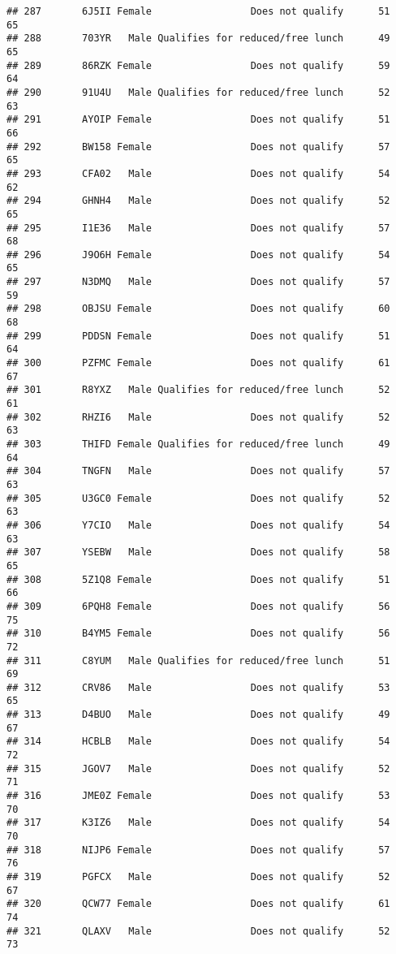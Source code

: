 \documentclass[
]{article}
\begin{document}
\begin{verbatim}
## 287       6J5II Female                 Does not qualify      51       65
## 288       703YR   Male Qualifies for reduced/free lunch      49       65
## 289       86RZK Female                 Does not qualify      59       64
## 290       91U4U   Male Qualifies for reduced/free lunch      52       63
## 291       AYOIP Female                 Does not qualify      51       66
## 292       BW158 Female                 Does not qualify      57       65
## 293       CFA02   Male                 Does not qualify      54       62
## 294       GHNH4   Male                 Does not qualify      52       65
## 295       I1E36   Male                 Does not qualify      57       68
## 296       J9O6H Female                 Does not qualify      54       65
## 297       N3DMQ   Male                 Does not qualify      57       59
## 298       OBJSU Female                 Does not qualify      60       68
## 299       PDDSN Female                 Does not qualify      51       64
## 300       PZFMC Female                 Does not qualify      61       67
## 301       R8YXZ   Male Qualifies for reduced/free lunch      52       61
## 302       RHZI6   Male                 Does not qualify      52       63
## 303       THIFD Female Qualifies for reduced/free lunch      49       64
## 304       TNGFN   Male                 Does not qualify      57       63
## 305       U3GC0 Female                 Does not qualify      52       63
## 306       Y7CIO   Male                 Does not qualify      54       63
## 307       YSEBW   Male                 Does not qualify      58       65
## 308       5Z1Q8 Female                 Does not qualify      51       66
## 309       6PQH8 Female                 Does not qualify      56       75
## 310       B4YM5 Female                 Does not qualify      56       72
## 311       C8YUM   Male Qualifies for reduced/free lunch      51       69
## 312       CRV86   Male                 Does not qualify      53       65
## 313       D4BUO   Male                 Does not qualify      49       67
## 314       HCBLB   Male                 Does not qualify      54       72
## 315       JGOV7   Male                 Does not qualify      52       71
## 316       JME0Z Female                 Does not qualify      53       70
## 317       K3IZ6   Male                 Does not qualify      54       70
## 318       NIJP6 Female                 Does not qualify      57       76
## 319       PGFCX   Male                 Does not qualify      52       67
## 320       QCW77 Female                 Does not qualify      61       74
## 321       QLAXV   Male                 Does not qualify      52       73

\end{verbatim}
\end{document}
